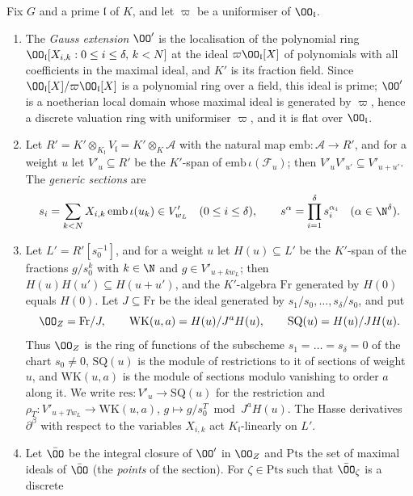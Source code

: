 \begin{definition}\label{pf:onto1:gauss}
Fix $G$ and a prime $\mathfrak l$ of $K$, and let $\varpi$ be a uniformiser of $\OO_{\mathfrak l}$.
\begin{enumerate}[label=(\roman*)]
\item The \emph{Gauss extension} $\OO'$ is the localisation of the polynomial ring $\OO_{\mathfrak
l}[X_{i,k}:0\le i\le\delta,\,k<N]$ at the ideal $\varpi\OO_{\mathfrak l}[X]$ of polynomials with all coefficients in
the maximal ideal, and $K'$ is its fraction field. Since $\OO_{\mathfrak l}[X]/\varpi\OO_{\mathfrak l}[X]$ is a
polynomial ring over a field, this ideal is prime; $\OO'$ is a noetherian local domain whose maximal ideal is
generated by $\varpi$, hence a discrete valuation ring with uniformiser $\varpi$, and it is flat over
$\OO_{\mathfrak l}$.
\item Let $R'=K'\otimes_{K_{\mathfrak l}}V_{\mathfrak l}=K'\otimes_K\mathcal A$ with the natural map
$\mathrm{emb}\colon\mathcal A\to R'$, and for a weight $u$ let $V'_u\subseteq R'$ be the $K'$-span of $\mathrm{emb}\,\iota(\mathcal
F_u)$; then $V'_uV'_{u'}\subseteq V'_{u+u'}$. The \emph{generic sections} are
\[
s_i=\sum_{k<N}X_{i,k}\,\mathrm{emb}\,\iota(u_k)\in V'_{w_L}\quad(0\le i\le\delta),\qquad
s^\alpha=\prod_{i=1}^{\delta}s_i^{\alpha_i}\quad(\alpha\in\N^\delta).
\]
\item Let $L'=R'[s_0^{-1}]$, and for a weight $u$ let $H(u)\subseteq L'$ be the $K'$-span of the fractions $g/s_0^k$
with $k\in\N$ and $g\in V'_{u+kw_L}$; then $H(u)H(u')\subseteq H(u+u')$, and the $K'$-algebra $\mathrm{Fr}$ generated by
$H(0)$ equals $H(0)$. Let $J\subseteq\mathrm{Fr}$ be the ideal generated by $s_1/s_0,\dots,s_\delta/s_0$, and put
\[
\OO_Z=\mathrm{Fr}/J,\qquad \mathrm{WK}(u,a)=H(u)/J^aH(u),\qquad \mathrm{SQ}(u)=H(u)/JH(u).
\]
Thus $\OO_Z$ is the ring of functions of the subscheme $s_1=\dots=s_\delta=0$ of the chart $s_0\ne0$,
$\mathrm{SQ}(u)$ is the module of restrictions to it of sections of weight $u$, and $\mathrm{WK}(u,a)$ is the module of
sections modulo vanishing to order $a$ along it. We write $\mathrm{res}\colon V'_u\to\mathrm{SQ}(u)$ for the
restriction and $\rho_T\colon V'_{u+Tw_L}\to\mathrm{WK}(u,a)$, $g\mapsto g/s_0^T\bmod J^aH(u)$. The Hasse derivatives
$\partial^\beta$ with respect to the variables $X_{i,k}$ act $K_{\mathfrak l}$-linearly on $L'$.
\item Let $\bar\OO$ be the integral closure of $\OO'$ in $\OO_Z$ and $\mathrm{Pts}$ the set of maximal ideals of
$\bar\OO$ (the \emph{points} of the section). For $\zeta\in\mathrm{Pts}$ such that $\bar\OO_\zeta$ is a discrete

\end{enumerate}
\end{definition}
